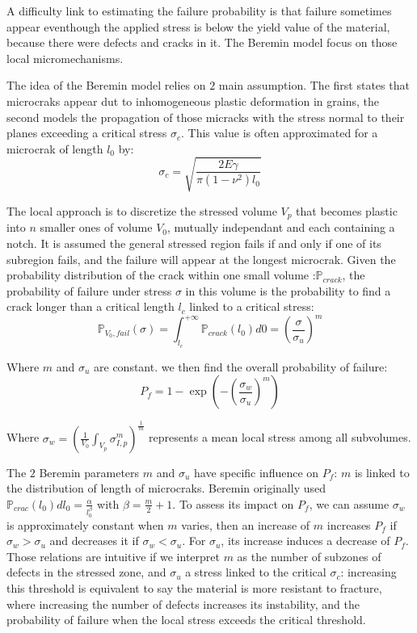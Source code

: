 \documentclass[
10pt, %
a4paper, %
oneside, %
headinclude,footinclude, %
BCOR5mm, %
]{scrartcl}
\begin{document}
A difficulty link to estimating the failure probability is that failure
sometimes appear eventhough the applied stress is below the yield value
of the material, because there were defects and cracks in it. The Beremin
model focus on those local micromechanisms.

The idea of the Beremin model relies on $2$ main assumption.
The first states that microcraks appear dut to inhomogeneous plastic
deformation in grains, the second models the propagation of those
micracks with the stress normal to their planes exceeding a
critical stress $\sigma_c$. This value is often approximated for
a microcrak of length $l_0$ by:
\begin{equation}
    \sigma_c = \sqrt{\frac{2E\gamma}{\pi(1-\nu^2)l_0}}
\end{equation}

The local approach is to discretize the stressed volume $V_p$ that
becomes plastic into $n$ smaller ones of volume $V_0$, mutually independant
and each containing a notch.
It is assumed the general stressed region fails if and
only if one of its subregion fails, and the failure will appear
at the longest microcrak.
Given the probability distribution of the crack within one small volume :$\mathbb{P}_{crack}$,
the probability of failure under stress $\sigma$ in this volume is the probability to find a
crack longer than a critical length $l_c$ linked to a critical stress:
\begin{equation}
    \mathbb{P}_{V_0,fail}(\sigma) = \displaystyle \int_{l_c}^{+\infty} \mathbb{P}_{crack}(l_0)d0 = \left(\frac{\sigma}{\sigma_u}\right)^m
\end{equation}

Where $m$ and $\sigma_u$ are constant. we then find the overall
probability of failure:
\begin{equation}
    P_{f} = 1 - \exp\left(-\left(\frac{\sigma_w}{\sigma_u}\right)^m\right)
\end{equation}

Where $\sigma_w = \displaystyle \left( \frac{1}{V_0} \int_{V_p} \sigma_{I,p}^m \right)^{\frac{1}{m}}$
represents a mean local stress among all subvolumes.

The $2$ Beremin parameters $m$ and $\sigma_u$ have specific influence on $P_f$:
$m$ is linked to the distribution of length of microcraks. Beremin originally
used $ \mathbb{P}_{crac}(l_0)dl_0 = \frac{\alpha}{l_0^{\beta}}$ with
$\beta = \frac{m}{2} + 1$. To assess its impact on $P_f$, we can
assume $\sigma_w$ is approximately constant when $m$ varies, then
an increase of $m$ increases $P_f$ if $\sigma_w > \sigma_u$ and
decreases it if $\sigma_w < \sigma_u$. For $\sigma_u$, its increase
induces a decrease of $P_f$.
Those relations are intuitive if we interpret $m$ as the number of
subzones of defects in the stressed zone, and $\sigma_u$ a stress linked
to the critical $\sigma_c$: increasing this threshold is equivalent
to say the material is more resistant to fracture, where increasing
the number of defects increases its instability, and the probability
of failure when the local stress exceeds the critical threshold.
\end{document}
